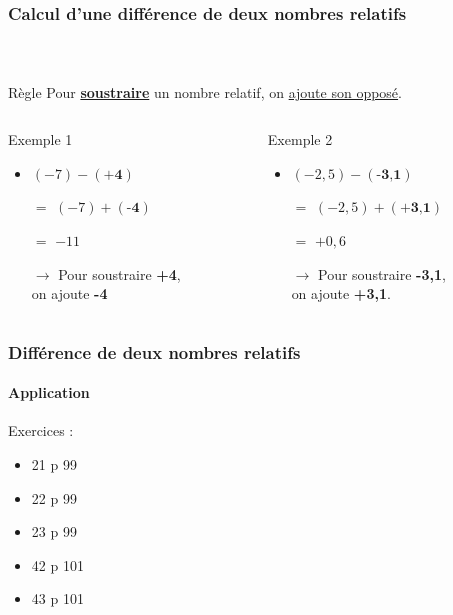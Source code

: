 \documentclass{beamer}
\begin{document}
\begin{frame}
	\frametitle{Calcul d'une différence de deux nombres relatifs}  
	\framesubtitle{\ }	
	
	\begin{block}{Règle}
		Pour \textbf{\underline{soustraire}} un nombre relatif, on \underline{ajoute son opposé}.
	\end{block}
	

		\begin{columns}[onlytextwidth]
			\begin{column}{0.465\textwidth}
				\begin{exampleblock}{Exemple 1}
					\begin{itemize}
						\item $ (-7) - (\textbf{+4}) $
						\item[$=$] $ (-7) + (\textbf{-4}) $
						\item[$=$] $ -11$
						\item[$\rightarrow$] Pour soustraire \textbf{+4},\\  on ajoute \textbf{-4}\pause
					\end{itemize}
				\end{exampleblock}
			\end{column}
			\begin{column}{0.465\textwidth}
				\begin{exampleblock}{Exemple 2}
					\begin{itemize}
						\item $ (-2,5) - (\textbf{-3,1}) $
						\item[$=$] $ (-2,5) + (\textbf{+3,1}) $
						\item[$=$] $ +0,6$
						\item[$\rightarrow$] Pour soustraire \textbf{-3,1},\\  on ajoute \textbf{+3,1}.
					\end{itemize}
				\end{exampleblock}
			\end{column}
		\end{columns}
	
\end{frame}

\begin{frame}
	\frametitle{Différence de deux nombres relatifs}  
	\framesubtitle{Application }	
	
	Exercices :
	\begin{itemize}
		\item 21 p 99
		\item 22 p 99
		\item 23 p 99
		\item 42 p 101
		\item 43 p 101
	\end{itemize}
\end{frame}
\end{document}
